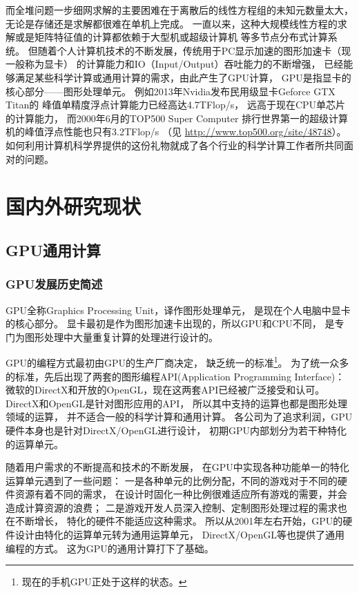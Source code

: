 而全堆问题一步细网求解的主要困难在于离散后的线性方程组的未知元数量太大，
无论是存储还是求解都很难在单机上完成。
一直以来，这种大规模线性方程的求解或是矩阵特征值的计算都依赖于大型机或超级计算机
等多节点分布式计算系统。
但随着个人计算机技术的不断发展，传统用于PC显示加速的图形加速卡（现一般称为显卡）
的计算能力和IO（Input/Output）吞吐能力的不断增强，
已经能够满足某些科学计算或通用计算的需求，由此产生了GPU计算，
GPU是指显卡的核心部分——图形处理单元。
例如2013年Nvidia发布民用级显卡Geforce GTX Titan的
峰值单精度浮点计算能力已经高达4.7TFlop/s，
远高于现在CPU单芯片的计算能力，
而2000年6月的TOP500 Super Computer \cite{meuer2001top500}
排行世界第一的超级计算机的峰值浮点性能也只有3.2TFlop/s
（见 \url{http://www.top500.org/site/48748}）。
如何利用计算机科学界提供的这份礼物就成了各个行业的科学计算工作者所共同面对的问题。

\section{国内外研究现状}

\subsection{GPU通用计算}

\subsubsection{GPU发展历史简述}
GPU全称Graphics Processing Unit，译作图形处理单元，
是现在个人电脑中显卡的核心部分。
显卡最初是作为图形加速卡出现的，所以GPU和CPU不同，
是专门为图形处理中大量重复计算的处理进行设计的。

GPU的编程方式最初由GPU的生产厂商决定，
缺乏统一的标准\footnote{现在的手机GPU正处于这样的状态。}。
为了统一众多的标准，先后出现了两套的图形编程API(Application Programming Interface)：
微软的DirectX和开放的OpenGL，现在这两套API已经被广泛接受和认可。
DirectX和OpenGL是针对图形应用的API，
所以其中支持的运算也都是图形处理领域的运算，
并不适合一般的科学计算和通用计算。
各公司为了追求利润，GPU硬件本身也是针对DirectX/OpenGL进行设计，
初期GPU内部划分为若干种特化的运算单元。

随着用户需求的不断提高和技术的不断发展，
在GPU中实现各种功能单一的特化运算单元遇到了一些问题：
一是各种单元的比例分配，不同的游戏对于不同的硬件资源有着不同的需求，
在设计时固化一种比例很难适应所有游戏的需要，并会造成计算资源的浪费；
二是游戏开发人员深入控制、定制图形处理过程的需求也在不断增长，
特化的硬件不能适应这种需求。
所以从2001年左右开始，GPU的硬件设计由特化的运算单元转为通用运算单元，
DirectX/OpenGL等也提供了通用编程的方式。
这为GPU的通用计算打下了基础。

